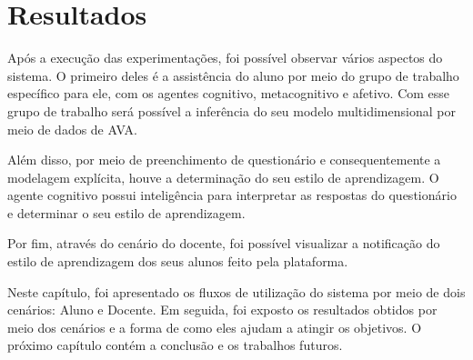 \section{Resultados}\label{section:resultados}
Após a execução das experimentações, foi possível observar vários aspectos do sistema. O primeiro deles é a assistência do aluno por meio do grupo de trabalho específico para ele, com os agentes cognitivo, metacognitivo e afetivo. Com esse grupo de trabalho será possível a inferência do seu modelo multidimensional por meio de dados de AVA.

Além disso, por meio de preenchimento de questionário e consequentemente a modelagem explícita, houve a determinação do seu estilo de aprendizagem. O agente cognitivo possui inteligência para interpretar as respostas do questionário e determinar o seu estilo de aprendizagem.

Por fim, através do cenário do docente, foi possível visualizar a notificação do estilo de aprendizagem dos seus alunos feito pela plataforma.

Neste capítulo, foi apresentado os fluxos de utilização do sistema por meio de dois cenários: Aluno e Docente. Em seguida, foi exposto os resultados obtidos por meio dos cenários e a forma de como eles ajudam a atingir os objetivos. O próximo capítulo contém a conclusão e os trabalhos futuros.
